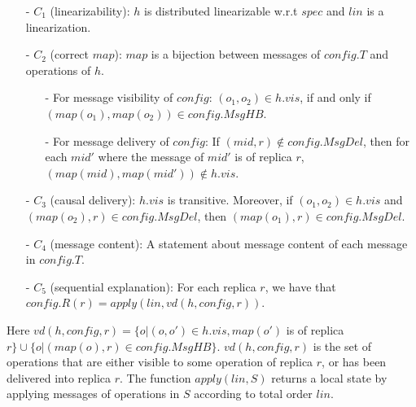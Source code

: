 \begin{itemize}
\setlength{\itemsep}{0.5pt}
\item[-] $C_1$ (linearizability): $h$ is distributed linearizable w.r.t $\mathit{spec}$ and $\mathit{lin}$ is a linearization.

\item[-] $C_2$ (correct $\mathit{map}$): $\mathit{map}$ is a bijection between messages of $\mathit{config}.T$ and operations of $h$.

    \begin{itemize}
    \setlength{\itemsep}{0.5pt}
    \item[-] For message visibility of $\mathit{config}$: $(o_1,o_2) \in h.\mathit{vis}$, if and only if $(\mathit{map}(o_1),\mathit{map}(o_2)) \in \mathit{config}.\mathit{MsgHB}$.

    \item[-] For message delivery of $\mathit{config}$: If $(\mathit{mid},r) \notin \mathit{config}.\mathit{MsgDel}$, then for each $\mathit{mid}'$ where the message of $\mathit{mid}'$ is of replica $r$, $(\mathit{map}(\mathit{mid}),\mathit{map}(\mathit{mid}')) \notin h.\mathit{vis}$.
    \end{itemize}

\item[-] $C_3$ (causal delivery): $h.\mathit{vis}$ is transitive. Moreover, if $(o_1,o_2) \in h.\mathit{vis}$ and $(\mathit{map}(o_2),r) \in \mathit{config}.\mathit{MsgDel}$, then $(\mathit{map}(o_1),r) \in \mathit{config}.\mathit{MsgDel}$.

\item[-] $C_4$ (message content): A statement about message content of each message in $\mathit{config}.T$.

\item[-] $C_5$ (sequential explanation): For each replica $r$, we have that $\mathit{config}.R(r) = \mathit{apply}(\mathit{lin},\mathit{vd}(h,\mathit{config},r))$. 
\end{itemize}

Here $\mathit{vd}(h,\mathit{config},r) = \{ o \vert (o,o') \in h.\mathit{vis}, \mathit{map}(o')$ is of replica $r \} \cup \{ o \vert (\mathit{map}(o),r) \in \mathit{config}.\mathit{MsgHB} \}$. $\mathit{vd}(h,\mathit{config},r)$ is the set of operations that are either visible to some operation of replica $r$, or has been delivered into replica $r$. The function $\mathit{apply}(\mathit{lin},S)$ returns a local state by applying messages of operations in $S$ according to total order $\mathit{lin}$.


